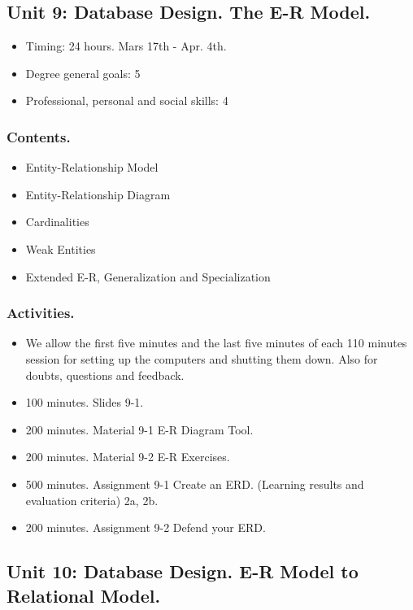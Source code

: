 \documentclass[catalan, a4paper, 12pt, titlepage]{article}
\begin{document}
  \subsection{Unit 9: Database Design. The E-R Model.}

  \begin{itemize}
	\item Timing: 24 hours. Mars 17th - Apr. 4th.
	\item Degree general goals: 5
	\item Professional, personal and social skills: 4
  \end{itemize}

  \subsubsection{Contents.}
  \begin{itemize}
	  \item Entity-Relationship Model
	  \item Entity-Relationship Diagram
	  \item Cardinalities
	  \item Weak Entities
	  \item Extended E-R, Generalization and Specialization
  \end{itemize}

  \subsubsection{Activities.}
  \begin{itemize}
          \item We allow the first five minutes and the last five minutes of each 110 minutes session for setting up the computers and shutting them down. Also for doubts, questions and feedback.
	  \item 100 minutes. Slides 9-1.
	  \item 200 minutes. Material 9-1 E-R Diagram Tool.
	  \item 200 minutes. Material 9-2 E-R Exercises.
	  \item 500 minutes. Assignment 9-1 Create an ERD. (\faGraduationCap Learning results and evaluation criteria) 2a, 2b.
	  \item 200 minutes. Assignment 9-2 Defend your ERD.
  \end{itemize}


  \subsection{Unit 10: Database Design. E-R Model to Relational Model.}
\end{document}

